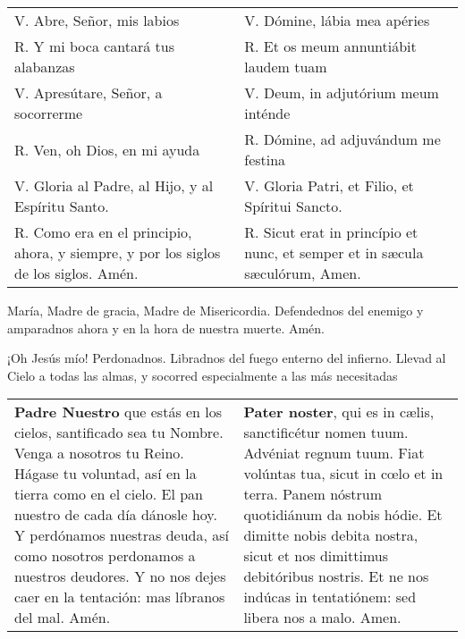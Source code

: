 \documentclass[./rosary.tex]{subfiles}
\begin{document}
\begin{longtable} {p{} p{} }
    V. Abre, Señor, mis labios                                                           & V. Dómine, lábia mea apéries                                                \\
    R. Y mi boca cantará tus alabanzas                                                   & R. Et os meum annuntiábit laudem tuam                                       \\
    V. Apresútare, Señor, a socorrerme                                                   & V. Deum, in adjutórium meum inténde                                         \\
    R. Ven, oh Dios, en mi ayuda                                                         & R. Dómine, ad adjuvándum me festina                                         \\
    V. Gloria al Padre, al Hijo, y al Espíritu Santo.\label{sec:glory}                   & V. Gloria Patri, et Filio, et Spíritui Sancto.                              \\
    R. Como era en el principio, ahora, y siempre, y por los siglos de los siglos. Amén. & R. Sicut erat in princípio et nunc, et semper et in sæcula sæculórum, Amen.
\end{longtable}

\begin{center}
    \label{endTenPrayers}
    María, Madre de gracia, Madre de Misericordia. Defendednos del enemigo y amparadnos ahora y en la hora de nuestra muerte. Amén.

    ¡Oh Jesús mío! Perdonadnos. Libradnos del fuego enterno del infierno. Llevad al Cielo a todas las almas, y socorred especialmente
    a las más necesitadas
\end{center}

\label{sec:ourFather}
\begin{longtable} { p{} p{} }
    \textbf{Padre Nuestro} que estás en los cielos, santificado sea tu Nombre. Venga a nosotros tu Reino.
    Hágase tu voluntad, así en la tierra como en el cielo. El pan nuestro de cada día dánosle hoy.
    Y perdónamos nuestras deuda, así como nosotros perdonamos a nuestros deudores.
    Y no nos dejes caer en la tentación: mas líbranos del mal. Amén.

     &

    \textbf{Pater noster}, qui es in cælis, sanctificétur nomen tuum. Advéniat regnum tuum.
    Fiat volúntas tua, sicut in cœlo et in terra. Panem nóstrum quotidiánum da nobis hódie.
    Et dimitte nobis debita nostra, sicut et nos dimittimus debitóribus nostris.
    Et ne nos indúcas in tentatiónem: sed libera nos a malo. Amen.
\end{longtable}
\end{document}

